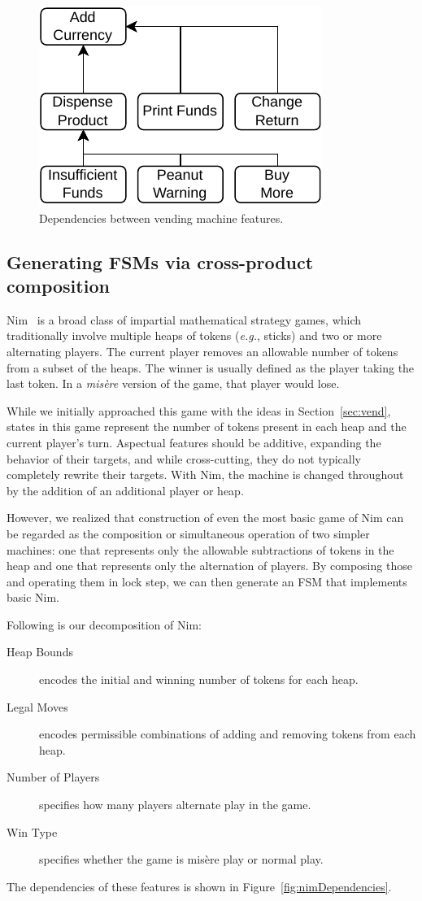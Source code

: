 \documentclass[sigplan,anonymous, review]{acmart}
\begin{document}
\begin{figure}
    \centering
    \includegraphics[width=0.55\linewidth]{figures/VendingMachine.pdf}
    \caption{Dependencies between vending machine features.}
    \label{fig:vmDependencies}
\end{figure}

\subsection{Generating FSMs via cross-product composition}\label{sec:nim}

Nim~\cite{enwiki:1102668015} is a broad class of impartial mathematical strategy games, which traditionally involve multiple heaps of tokens (\textit{e.g.}, sticks) and two or more alternating players. The current player removes an allowable number of tokens from a subset of the heaps. The winner is usually defined as the player taking the last token. In a \textit{mis\`{e}re} version of the game, that player would lose.

While we initially approached this game with the ideas in Section~\ref{sec:vend}, states in this game represent the number of tokens present in each heap and the current player's turn.  Aspectual features should be additive, expanding the behavior of their targets, and while cross-cutting, they do not typically completely rewrite their targets.  With Nim, the machine is changed throughout by the addition of an additional player or heap.   

However, we realized that construction of even the most basic game of Nim can be regarded as the composition or simultaneous operation of two simpler machines:   one that represents only the allowable subtractions of tokens in the heap and one that represents only the alternation of players.   By composing those and operating them in lock step, we can then generate an FSM that implements basic Nim.

Following is our decomposition of Nim:
\begin{description}
    \item[Heap Bounds] encodes the initial and winning number of tokens for each heap.
    \item[Legal Moves] encodes permissible combinations of adding and removing tokens from each heap.
    \item[Number of Players] specifies how many players alternate play in the game.
    \item[Win Type] specifies whether the game is mis\`{e}re play or normal play.
\end{description}
The dependencies of these features is shown in Figure~\ref{fig:nimDependencies}.  
\end{document}

